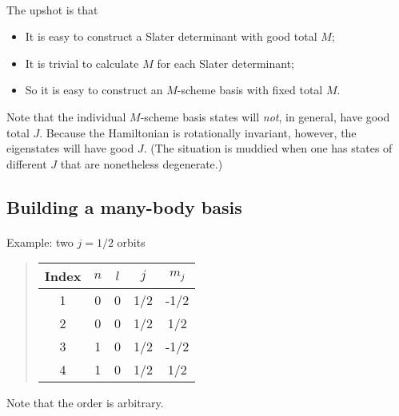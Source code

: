 \documentclass[%
oneside,                 %
final,                   %
10pt]{article}
\begin{document}
\paragraph{}

The upshot is that 
\begin{itemize}
\item It is easy to construct a Slater determinant with good total $M$;

\item It is trivial to calculate $M$ for each Slater determinant;

\item So it is easy to construct an $M$-scheme basis with fixed total $M$.
\end{itemize}

\noindent
Note that the individual $M$-scheme basis states will \emph{not}, in general, 
have good total $J$. 
Because the Hamiltonian is rotationally invariant, however, the eigenstates will 
have good $J$. (The situation is muddied when one has states of different $J$ that are 
nonetheless degenerate.)



\subsection*{Building a many-body basis}

\paragraph{}
Example: two $j=1/2$ orbits


\begin{quote}
\begin{tabular}{ccccc}
\hline
\multicolumn{1}{c}{ Index } & \multicolumn{1}{c}{ $n$ } & \multicolumn{1}{c}{ $l$ } & \multicolumn{1}{c}{ $j$ } & \multicolumn{1}{c}{ $m_j$ } \\
\hline
1     & 0   & 0   & 1/2 & -1/2  \\
2     & 0   & 0   & 1/2 & 1/2   \\
3     & 1   & 0   & 1/2 & -1/2  \\
4     & 1   & 0   & 1/2 & 1/2   \\
\hline
\end{tabular}
\end{quote}

\noindent
Note that the order is arbitrary.
\end{document}
